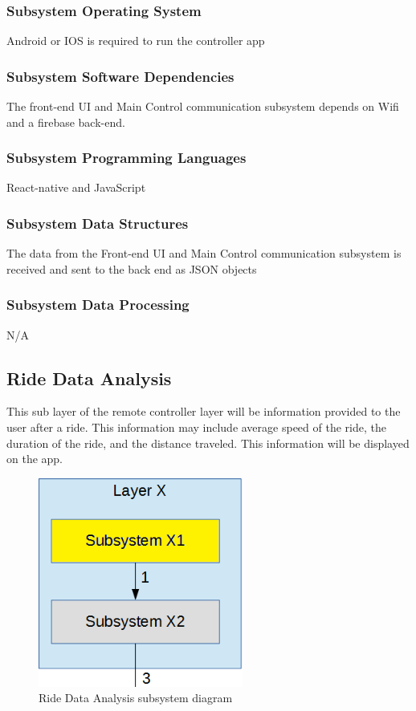 \subsubsection{Subsystem Operating System}
Android or IOS is required to run the controller app

\subsubsection{Subsystem Software Dependencies}
The front-end UI and Main Control communication subsystem depends on Wifi and a firebase back-end.

\subsubsection{Subsystem Programming Languages}
React-native and JavaScript 

\subsubsection{Subsystem Data Structures}
The data from the Front-end UI and Main Control communication subsystem is received and sent to the back end as JSON objects

\subsubsection{Subsystem Data Processing}
N/A

\subsection{Ride Data Analysis}
This sub layer of the remote controller layer will be information provided to the user after a ride. This information may include average speed of the ride, the duration of the ride, and the distance traveled. This information will be displayed on the app.

\begin{figure}[h!]
	\centering
 	\includegraphics[width=0.60\textwidth]{images/subsystem} %
 \caption{Ride Data Analysis subsystem diagram} %
\end{figure}

